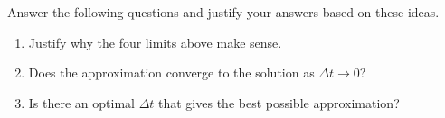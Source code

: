 \begin{exercises}
\begin{problist}
	Answer the following questions and justify your answers based on these ideas.
	\begin{enumerate}
		\item Justify why the four limits above make sense.
		\item Does the approximation converge to the solution as $\Delta t \to 0$?
		\item Is there an optimal $\Delta t$ that gives the best possible approximation?
	\end{enumerate}
	
	

	
	
	\end{problist}
\end{exercises}